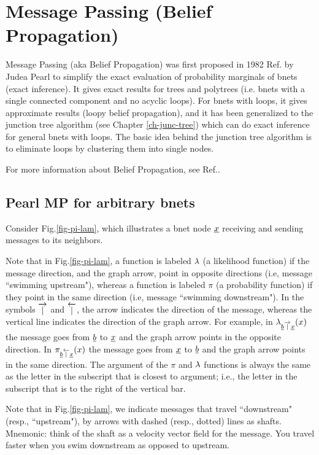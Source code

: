 \chapter{Message Passing 
(Belief Propagation)}\label{ch-mp}

Message Passing (aka Belief Propagation)
was first proposed in 1982
Ref.\cite{pearl1982reverend} by Judea Pearl
to simplify
the exact evaluation of probability marginals
of bnets (exact inference).
It gives exact results for trees and
polytrees (i.e. bnets with
a single connected component and
 no acyclic
loops). For bnets with loops,
it gives approximate results 
(loopy belief propagation),
and it has been generalized to
the junction tree algorithm 
(see Chapter \ref{ch-junc-tree})
which can do exact inference
for general bnets with loops.
The basic idea behind
the junction tree algorithm
is to eliminate 
loops by clustering
them into single nodes.

For more information
about Belief Propagation,
see Ref.\cite{wiki-mp}.


\section*{Pearl MP for arbitrary bnets}



Consider Fig.\ref{fig-pi-lam},
which illustrates
a bnet node ${\underline{x}}$ receiving and sending
messages to its neighbors.

Note that in Fig.\ref{fig-pi-lam}, 
a function is labeled
$\lambda$ (a likelihood
function)  if the
message direction,
 and the  graph arrow,
 point in opposite directions
(i.e, message ``swimming upstream"),
whereas a 
function is labeled $\pi$
(a probability function)  if 
they point in the same direction
(i.e, message ``swimming downstream").
In the symbols $\overrightarrow{|}$
and $\overleftarrow{|}$, the arrow
indicates  the direction of the message,
whereas the vertical line indicates
the direction of the graph arrow.
For  example, in 
$\lambda_{{\underline{b}}\overrightarrow{|}{\underline{x}}}(x)$
the message goes from
${\underline{b}}$ to ${\underline{x}}$ and the 
graph arrow
points in the opposite direction.
In 
$\pi_{{\underline{b}}\overleftarrow{|}{\underline{x}}}(x)$
the message goes from
${\underline{x}}$ to ${\underline{b}}$ and the 
graph arrow
points in the same direction.
The argument of the $\pi$
and $\lambda$
functions is always the same 
as the letter in the subscript 
that is closest to argument; i.e., the
letter in the subscript that is
to the right of the vertical bar.

Note that in Fig.\ref{fig-pi-lam},
we indicate
messages that travel 
``downstream" 
(resp., ``upstream"), by
arrows with dashed (resp., dotted)
 lines as shafts.
Mnemonic: think of the shaft as a
 velocity vector field
for the message. 
You travel faster when
you swim downstream as opposed
to upstream.

